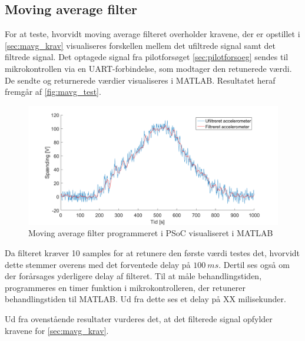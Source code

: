 \subsection{Moving average filter}
For at teste, hvorvidt moving average filteret overholder kravene, der er opstillet i \autoref{sec:mavg_krav} visualiseres forskellen mellem det ufiltrede signal samt det filtrede signal. Det optagede signal fra pilotforsøget \autoref{sec:pilotforsoeg} sendes til mikrokontrollen via en UART-forbindelse, som modtager den retunerede værdi. De sendte og returnerede værdier visualiseres i MATLAB. Resultatet heraf fremgår af \autoref{fig:mavg_test}. 

\begin{figure}[H]
	\centering
	\includegraphics[width=1\textwidth]{figures/accelerometer_filter}
	\caption{Moving average filter programmeret i PSoC visualiseret i MATLAB}
	\label{fig:mavg_test}
\end{figure}


\noindent
Da filteret kræver 10 samples for at retunere den første værdi testes det, hvorvidt dette stemmer overens med det forventede delay på $100~ms$. Dertil ses også om der forårsages yderligere delay af filteret. Til at måle behandlingstiden, programmeres en timer funktion i mikrokontrolleren, der retunerer behandlingstiden til MATLAB. Ud fra dette ses et delay på XX milisekunder.

Ud fra ovenstående resultater vurderes det, at det filterede signal opfylder kravene for \autoref{sec:mavg_krav}. 